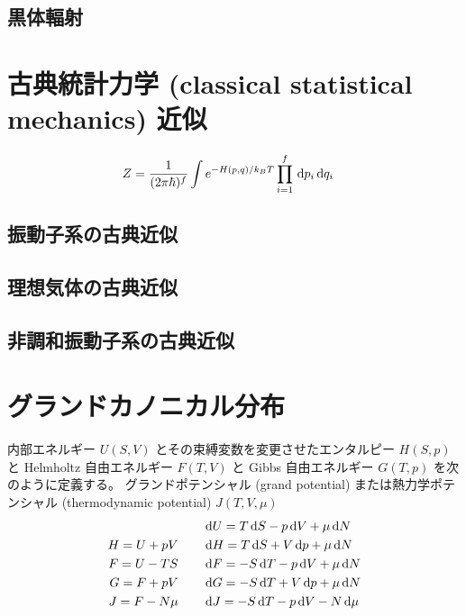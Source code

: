 \documentclass[a4paper,11pt]{jlreq}
\begin{document}
\subsection{黒体輻射}

\section{古典統計力学 (classical statistical mechanics) 近似}

\begin{theorem}
  \begin{align}
    Z & = \frac{1}{(2\pi\hbar)^f}\int e^{-H(p, q)/k_BT}\prod_{i=1}^{f}\dl{p_i}\dl{q_i}
  \end{align}
\end{theorem}

\subsection{振動子系の古典近似}
\subsection{理想気体の古典近似}
\subsection{非調和振動子系の古典近似}


\section{グランドカノニカル分布}
\begin{definition}
  内部エネルギー $U(S, V)$ とその束縛変数を変更させたエンタルピー $H(S, p)$ と Helmholtz 自由エネルギー $F(T, V)$ と Gibbs 自由エネルギー $G(T, p)$ を次のように定義する。
  グランドポテンシャル (grand potential) または熱力学ポテンシャル (thermodynamic potential) $J(T, V, \mu)$
  \begin{align}
                 & \qquad \dl{U} = T\dl{S} - p\dl{V} + \mu\dl{N}  \\
    H = U + pV   & \qquad \dl{H} = T\dl{S} + V\dl{p} + \mu\dl{N}  \\
    F = U - TS   & \qquad \dl{F} = -S\dl{T} - p\dl{V} + \mu\dl{N} \\
    G = F + pV   & \qquad \dl{G} = -S\dl{T} + V\dl{p} + \mu\dl{N} \\
    J = F - N\mu & \qquad \dl{J} = -S\dl{T} - p\dl{V} - N\dl{\mu}
  \end{align}
\end{definition}
\end{document}
